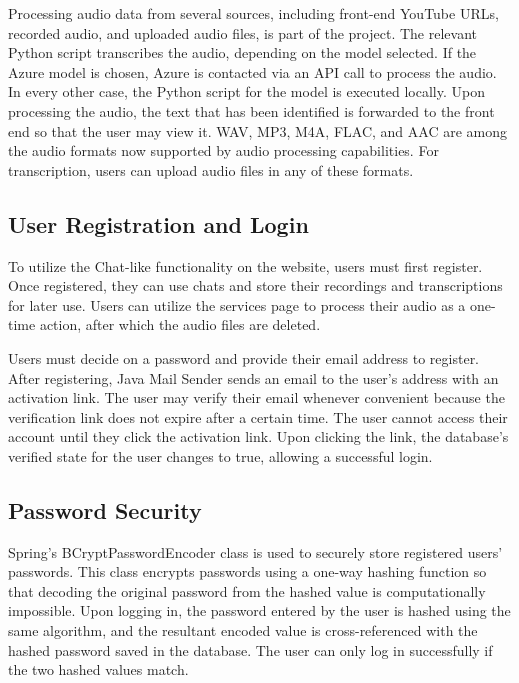 \documentclass[conference]{IEEEtran}
\begin{document}
Processing audio data from several sources, including front-end YouTube URLs, recorded audio, and uploaded audio files, is part of the project. The relevant Python script transcribes the audio, depending on the model selected. If the Azure model is chosen, Azure is contacted via an API call to process the audio. In every other case, the Python script for the model is executed locally. Upon processing the audio, the text that has been identified is forwarded to the front end so that the user may view it. WAV, MP3, M4A, FLAC, and AAC are among the audio formats now supported by audio processing capabilities. For transcription, users can upload audio files in any of these formats.


\subsection{User Registration and Login}

To utilize the Chat-like functionality on the website, users must first register. Once registered, they can use chats and store their recordings and transcriptions for later use. Users can utilize the services page to process their audio as a one-time action, after which the audio files are deleted. 

Users must decide on a password and provide their email address to register. After registering, Java Mail Sender sends an email to the user's address with an activation link. The user may verify their email whenever convenient because the verification link does not expire after a certain time. The user cannot access their account until they click the activation link. Upon clicking the link, the database's verified state for the user changes to true, allowing a successful login.

\subsection{Password Security}

Spring's BCryptPasswordEncoder class is used to securely store registered users' passwords. This class encrypts passwords using a one-way hashing function so that decoding the original password from the hashed value is computationally impossible. Upon logging in, the password entered by the user is hashed using the same algorithm, and the resultant encoded value is cross-referenced with the hashed password saved in the database. The user can only log in successfully if the two hashed values match.
\end{document}
